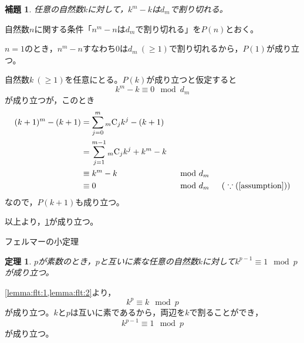 \documentclass{article}
\makeatletter
\renewenvironment{proof}[1][\proofname]{\par
        \pushQED{\qed}
        \normalfont
        \topsep6\p@\@plus6\p@ \trivlist
        \item[\hskip\labelsep{\bfseries #1}\@addpunct{\bfseries}]\ignorespaces
    }{%
        \popQED\endtrivlist\@endpefalse
    }
\renewcommand{\proofname}{証明.}
\newtheorem{theorem}{定理}
\newtheorem{lemma}{補題}
\newcommand{\combination}[2]{{}_{#1} \mathrm{C}_{#2}}
\makeatother
\begin{document}
\begin{screen}
    \begin{lemma}
        \label{lemma:flt:2}
        任意の自然数$k$に対して，$k^m - k$は$d_m$で割り切れる。
    \end{lemma}
\end{screen}

\begin{proof}
    自然数$n$に関する条件「$n^m - n$は$d_m$で割り切れる」を$P(n)$とおく。

    $n = 1$のとき，$n^m - n$すなわち0は$d_m\ (\geq 1)$で割り切れるから，$P(1)$が成り立つ。

    自然数$k\ (\geq 1)$を任意にとる。$P(k)$が成り立つと仮定すると
    \begin{equation}
        \label{assumption}
        k^m - k \equiv 0 \mod{d_m}
    \end{equation}
    が成り立つが，このとき
    \begin{alignat}{2}
        (k + 1)^m - (k + 1) &= \sum_{j = 0}^{m} \combination{m}{j} k^j - (k + 1) & & \\
                            &= \sum_{j = 1}^{m - 1} \combination{m}{j} k^j + k^m - k & & \\
                            &\equiv k^m - k & &\mod{d_m} \\
                            &\equiv 0 & &\mod{d_m} \hspace{15pt} (\ \because (\ref{assumption}) )
    \end{alignat}
    なので，$P(k + 1)$も成り立つ。

    以上より，\cref{lemma:flt:2}が成り立つ。
\end{proof}

\begin{itembox}[l]{フェルマーの小定理}
    \begin{theorem}
        \label{theorem:flt}
        $p$が素数のとき，$p$と互いに素な任意の自然数$k$に対して$k^{p - 1} \equiv 1 \mod{p}$が成り立つ。
    \end{theorem}
\end{itembox}

\begin{proof}
    \cref{lemma:flt:1,lemma:flt:2}より，
    \begin{equation}
        k^p \equiv k \mod{p}
    \end{equation}
    が成り立つ。$k$と$p$は互いに素であるから，両辺を$k$で割ることができ，
    \begin{equation}
        k^{p - 1} \equiv 1 \mod{p}
    \end{equation}
    が成り立つ。
\end{proof}
\end{document}
